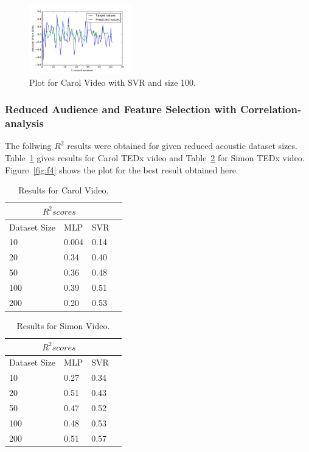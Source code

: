 \begin{figure}
\centering
\includegraphics[width=0.4\textwidth]{f3.pdf}
\caption{\label{fig:f3}Plot for Carol Video with SVR and size 100.}
\end{figure} 

\subsubsection{Reduced Audience and Feature Selection with Correlation-analysis}

The follwing $R^2$ results were obtained for given reduced acoustic dataset sizes. Table~\ref{tab:carol4} gives results for Carol TEDx video and Table~\ref{tab:simon4} for Simon TEDx video. Figure~\ref{fig:f4} shows the plot for the best result obtained here.

\begin{table}
\centering
\begin{tabular}{ |p{3cm}||p{3cm}|p{3cm}|p{3cm}|  }
 \hline
 \multicolumn{3}{|c|}{$R^2 scores$} \\
 \hline
 Dataset Size &MLP &SVR\\
 \hline
 10 & 0.004 & 0.14\\
 20 & 0.34 & 0.40\\
 50 & 0.36 & 0.48\\
 100 & 0.39 & 0.51\\
 200 & 0.20 & 0.53\\
 \hline
\end{tabular}
\caption{\label{tab:carol4}Results for Carol Video.}
\end{table}

\begin{table}
\centering
\begin{tabular}{ |p{3cm}||p{3cm}|p{3cm}|p{3cm}|  }
 \hline
 \multicolumn{3}{|c|}{$R^2 scores$} \\
 \hline
 Dataset Size &MLP &SVR\\
 \hline
 10 & 0.27 & 0.34\\
 20 & 0.51 & 0.43\\
 50 & 0.47 & 0.52\\
 100 & 0.48 & 0.53\\
 200 & 0.51 & 0.57\\
 \hline
\end{tabular}
\caption{\label{tab:simon4}Results for Simon Video.}
\end{table}


